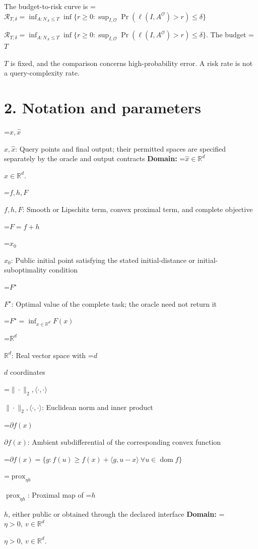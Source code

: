 \documentclass[10pt,a4paper]{article}
\newcommand{\AtlasMath}[1]{\par\begingroup\centering\setbox0=\hbox{$\displaystyle #1$}\ifdim\wd0>1.4\linewidth\typeout{ATLAS WIDE FORMULA: \the\wd0}\fi\ifdim\wd0>\linewidth\resizebox{\linewidth}{!}{\box0}\else\box0\fi\par\endgroup}
\newcommand{\AtlasInlineMath}[1]{\begingroup\setbox0=\hbox{$#1$}\ifdim\wd0>.4\linewidth\endgroup\AtlasMath{#1}\else\endgroup$#1$\fi}
\begin{document}
The budget-to-risk curve is \AtlasInlineMath{\mathcal R_{T,\delta}=\inf_{A:N_A\le T}\inf\{r\ge0:\sup_{I,\mathcal O}\Pr(\ell(I,A^{\mathcal O})>r)\le\delta\}}. The budget \AtlasInlineMath{T} is fixed, and the comparison concerns high-probability error. A risk rate is not a query-complexity rate.



\section{2. Notation and parameters}


\AtlasInlineMath{x,\widehat{x}}: Query points and final output; their permitted spaces are specified separately by the oracle and output contracts \textbf{Domain:} \AtlasInlineMath{\widehat{x}\in \mathbb{R}^d}.



\AtlasInlineMath{f,h,F}: Smooth or Lipschitz term, convex proximal term, and complete objective




\AtlasMath{F=f+h}




\AtlasInlineMath{x_0}: Public initial point satisfying the stated initial-distance or initial-suboptimality condition



\AtlasInlineMath{F^\star}: Optimal value of the complete task; the oracle need not return it




\AtlasMath{F^\star=\inf_{x\in \mathbb{R}^d}F(x)}




\AtlasInlineMath{\mathbb{R}^d}: Real vector space with \AtlasInlineMath{d} coordinates



\AtlasInlineMath{\|\cdot\|_2,\langle\cdot,\cdot\rangle}: Euclidean norm and inner product



\AtlasInlineMath{\partial f(x)}: Ambient subdifferential of the corresponding convex function




\AtlasMath{\partial f(x)=\{g:f(u)\ge f(x)+\langle g,u-x\rangle\ \forall u\in\operatorname{dom}f\}}




\AtlasInlineMath{\operatorname{prox}_{\eta h}}: Proximal map of \AtlasInlineMath{h}, either public or obtained through the declared interface \textbf{Domain:} \AtlasInlineMath{\eta>0,\ v\in\mathbb{R}^d}.
\end{document}

